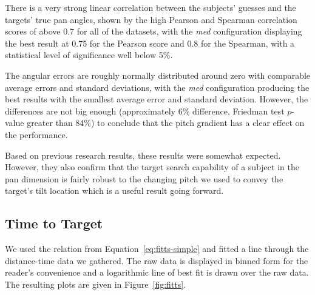\documentclass[format=sigconf, review=true, screen=true, anonymous=true]{acmart}
\begin{document}
There is a very strong linear correlation between the subjects' guesses and the targets' true pan angles, shown by the high Pearson and Spearman correlation scores of above 0.7 for all of the datasets, with the \emph{med} configuration displaying the best result at 0.75 for the Pearson score and 0.8 for the Spearman, with a statistical level of significance well below 5\%. 

The angular errors are roughly normally distributed around zero with comparable average errors and standard deviations, with the \emph{med} configuration producing the best results with the smallest average error and standard deviation. However, the differences are not big enough (approximately 6\% difference, Friedman test $p$-value greater than 84\%) to conclude that the pitch gradient has a clear effect on the performance. 


Based on previous research results, these results were somewhat expected. However, they also confirm that the target search capability of a subject in the pan dimension is fairly robust to the changing pitch we used to convey the target's tilt location which is a useful result going forward. %

\subsection{Time to Target}

We used the relation from Equation~\ref{eq:fitts-simple} and fitted a line through the distance-time data we gathered. The raw data is displayed in binned form for the reader's convenience and a logarithmic line of best fit is drawn over the raw data. The resulting plots are given in Figure~\ref{fig:fitts}. 
\end{document}
